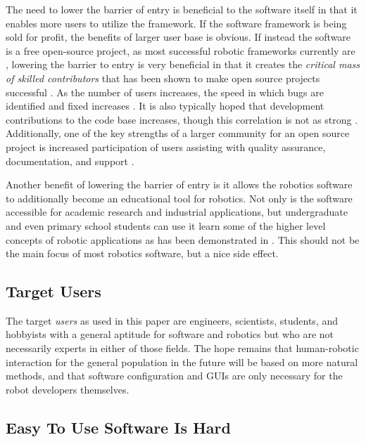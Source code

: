 \documentclass[10pt,journal,compsoc]{joser1}
\begin{document}
{The need to lower the barrier of entry is beneficial to the software itself in that it enables more users to utilize the framework. If the software framework is being sold for profit, the benefits of larger user base is obvious. If instead the software is a free open-source project, as most successful robotic frameworks currently are \cite{makarenko2007benefits}, lowering the barrier to entry is very beneficial in that it creates the \textit{critical mass of skilled contributors} that has been shown to make open source projects successful \cite{bruyninckx2001open}. As the number of users increases, the speed in which bugs are identified and fixed increases \cite{schmidt1999software}. It is also typically hoped that development contributions to the code base increases, though this correlation is not as strong \cite{schmidt1999software}. Additionally, one of the key strengths of a larger community for an open source project is increased participation of users assisting with quality assurance, documentation, and support \cite{schmidt2001leveraging}.

Another benefit of lowering the barrier of entry is it allows the robotics software to additionally become an educational tool for robotics. Not only is the software accessible for academic research and industrial applications, but undergraduate and even primary school students can use it learn some of the higher level concepts of robotic applications as has been demonstrated in \cite{correll2013one, moll2011teaching, }. This should not be the main focus of most robotics software, but a nice side effect.

\subsection{Target Users}

The target \textit{users} as used in this paper are engineers, scientists, students, and hobbyists with a general aptitude for software and robotics but who are not necessarily experts in either of those fields. The hope remains that human-robotic interaction for the general population in the future will be based on more natural methods, and that software configuration and GUIs are only necessary for the robot developers themselves.

\subsection{Easy To Use Software Is Hard}

}
\end{document}
